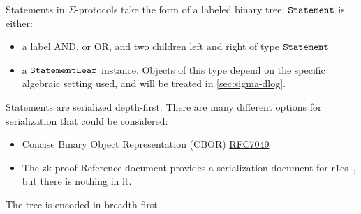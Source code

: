 \documentclass[11pt]{article}
\begin{document}
Statements in $\Sigma$-protocols take the form of a labeled binary tree:
$\texttt{Statement}$ is either:
\begin{itemize}
  \item a label \textsf{AND}, or \textsf{OR}, and two children \textsf{left} and \textsf{right} of type $\texttt{Statement}$
  \item a $\texttt{StatementLeaf}$ instance. Objects of this type depend on the specific algebraic setting used, and will be treated in \cref{sec:sigma-dlog}.
\end{itemize}
Statements are serialized depth-first.
  There are many different options for serialization that could be considered:
  \begin{itemize}
  \item Concise Binary Object Representation (CBOR) \href{https://datatracker.ietf.org/doc/html/rfc7049}{RFC7049}
    \item The zk proof Reference document provides a serialization document for r1cs~\cite[3.4.2]{zkproof-reference}, but there is nothing in it.
\end{itemize}
The tree is encoded in breadth-first.






\end{document}
